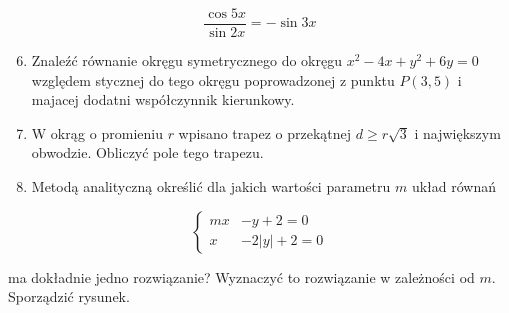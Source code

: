 \documentclass[10pt]{article}
\begin{document}
$$
\frac{\cos 5 x}{\sin 2 x}=-\sin 3 x
$$

\begin{enumerate}
  \setcounter{enumi}{5}
  \item Znaleźć równanie okręgu symetrycznego do okręgu $x^{2}-4 x+y^{2}+6 y=0$ względem stycznej do tego okręgu poprowadzonej z punktu $P(3,5)$ i majacej dodatni współczynnik kierunkowy.
  \item W okrąg o promieniu $r$ wpisano trapez o przekątnej $d \geqslant r \sqrt{3}$ i największym obwodzie. Obliczyć pole tego trapezu.
  \item Metodą analityczną określić dla jakich wartości parametru $m$ układ równań
\end{enumerate}

$$
\left\{\begin{array}{rr}
m x & -y+2=0 \\
x & -2|y|+2=0
\end{array}\right.
$$

ma dokładnie jedno rozwiązanie? Wyznaczyć to rozwiązanie w zależności od $m$. Sporządzić rysunek.
\end{document}
